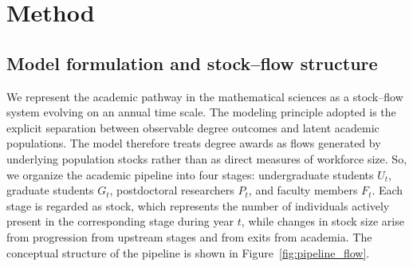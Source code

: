 \documentclass[3p]{elsarticle}%
\theoremstyle{definition}
\begin{document}
\section{Method}\label{sec2}

\subsection{Model formulation and stock--flow structure}
 \noindent We represent the academic pathway in the mathematical sciences as a stock--flow system evolving on an annual time scale. The modeling principle adopted is the explicit separation between observable degree outcomes and latent academic populations. The model therefore treats degree awards as flows generated by underlying population stocks rather than as direct measures of workforce size. So, we organize the academic pipeline into four stages: undergraduate students $U_t$, graduate students $G_t$, postdoctoral researchers $P_t$, and faculty members $F_t$. Each stage is regarded as stock, which represents the number of individuals actively present in the corresponding stage during year $t$, while changes in stock size arise from progression from upstream stages and from exits from academia. The conceptual structure of the pipeline is shown in Figure~\ref{fig:pipeline_flow}.
\end{document}
